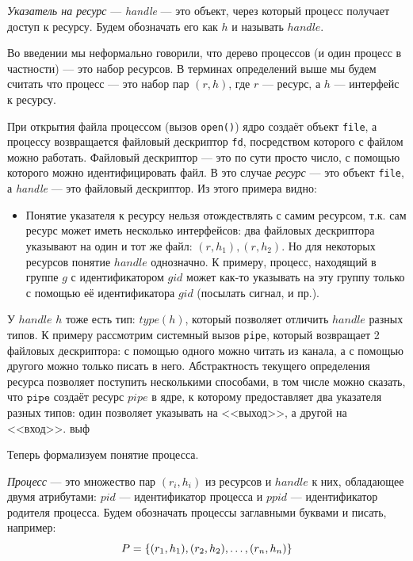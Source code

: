 \begin{defn}
\emph{Указатель на ресурс} --- \textit{handle} --- это объект, через который процесс получает доступ к ресурсу.
Будем обозначать его как $h$ и называть $handle$.
\end{defn}

Во введении мы неформально говорили, что дерево процессов (и один процесс в частности) --- это набор ресурсов. В 
терминах определений выше мы будем считать что процесс --- это набор пар $(r, h)$, где $r$ --- ресурс, а $h$ --- 
интерфейс к ресурсу.

\begin{exmp}
При открытия файла процессом (вызов \texttt{open()}) ядро создаёт объект \texttt{file}, а процессу возвращается 
файловый дескриптор \texttt{fd}, посредством которого с файлом можно работать. Файловый дескриптор --- это по сути 
просто число, с помощью которого можно идентифицировать файл. В это случае \emph{ресурс} --- это объект \texttt{file}, 
а \emph{handle} --- это файловый дескриптор. Из этого примера видно:
\begin{itemize}
	\item Понятие указателя к ресурсу нельзя отождествлять с самим ресурсом, т.к. сам ресурс может иметь несколько 
	интерфейсов: два файловых дескриптора указывают на один и тот же файл: $(r, h_1), (r, h_2)$. Но для некоторых 
	ресурсов понятие $handle$ однозначно. К примеру, процесс, находящий в группе $g$ с идентификатором $gid$ может 
	как-то указывать на эту группу только с помощью её идентификатора $gid$ (посылать сигнал, и пр.).
\end{itemize}
\end{exmp}

У $handle$ $h$ тоже есть тип: $type(h)$, который позволяет отличить $handle$ разных типов. К примеру рассмотрим 
системный вызов \texttt{pipe}, который возвращает 2 файловых дескриптора: с помощью одного можно читать из канала, а с 
помощью другого можно только писать в него. Абстрактность текущего определения ресурса позволяет поступить несколькими 
способами, в том числе можно сказать, что $\texttt{pipe}$ создаёт ресурс $pipe$ в ядре, к которому предоставляет два 
указателя разных типов: один позволяет указывать на <<выход>>, а другой на <<вход>>. выф

Теперь формализуем понятие процесса.

\begin{defn}
\emph{Процесс} --- это множество пар $(r_i, h_i)$ из ресурсов и $handle$ к них, обладающее двумя атрибутами: $pid$ --- 
идентификатор процесса и $ppid$ --- идентификатор родителя процесса. Будем обозначать процессы заглавными буквами и 
писать, например: 
\begin{equation*}
P = \left\lbrace (r_1, h_1), (r_2, h_2), \ldots, (r_n, h_n) \right\rbrace
\end{equation*}
\end{defn}

